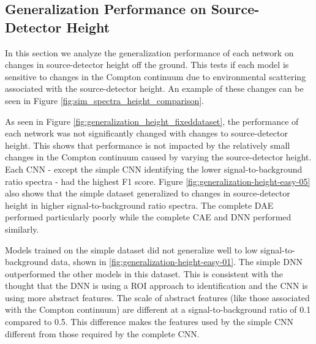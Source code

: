 



\subsection{Generalization Performance on Source-Detector Height}

In this section we analyze the generalization performance of each network on changes in source-detector height off the ground. This tests if each model is sensitive to changes in the Compton continuum due to environmental scattering associated with the source-detector height. An example of these changes can be seen in Figure \ref{fig:sim_spectra_height_comparison}.

As seen in Figure \ref{fig:generalization_height_fixeddataset}, the performance of each network was not significantly changed with changes to source-detector height. This shows that performance is not impacted by the relatively small changes in the Compton continuum caused by varying the source-detector height. Each CNN - except the simple CNN identifying the lower signal-to-background ratio spectra - had the highest F1 score. Figure \ref{fig:generalization-height-easy-05} also shows that the simple dataset generalized to changes in source-detector height in higher signal-to-background ratio spectra. The complete DAE performed particularly poorly while the complete CAE and DNN performed similarly.

Models trained on the simple dataset did not generalize well to low signal-to-background data, shown in \ref{fig:generalization-height-easy-01}. The simple DNN outperformed the other models in this dataset. This is consistent with the thought that the DNN is using a ROI approach to identification and the CNN is using more abstract features. The scale of abstract features (like those associated with the Compton continuum) are different at a signal-to-background ratio of 0.1 compared to 0.5. This difference makes the features used by the simple CNN different from those required by the complete CNN.


